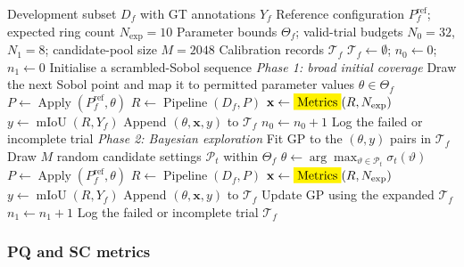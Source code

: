 \documentclass[a4paper,fleqn]{cas-dc}
\let\texthl\hl
\renewcommand{\hl}[1]{\ifmmode\colorbox{yellow}{\ensuremath{#1}}\else\texthl{#1}\fi}
\begin{document}
\begin{algorithm}[ht]
\caption{Generating calibration examples through space-filling
sampling and Bayesian exploration}
\label{alg:bo_exploration}
\begin{algorithmic}[1]
\Require Development subset $D_f$ with GT annotations $Y_f$
\Require Reference configuration $P_f^{\mathrm{ref}}$; expected ring count $N_{\mathrm{exp}}=10$
\Require Parameter bounds $\Theta_f$;
         valid-trial budgets $N_0=32$, $N_1=8$;
         candidate-pool size $M=2048$
\Ensure Calibration records $\mathcal{T}_f$
\State $\mathcal{T}_f\gets\emptyset$;
       $n_0\gets0$; $n_1\gets0$
\State Initialise a scrambled-Sobol sequence
\Statex \textit{Phase 1: broad initial coverage}
    \State Draw the next Sobol point and map it to
           permitted parameter values $\theta\in\Theta_f$
    \State $P\gets\operatorname{Apply}
           (P_f^{\mathrm{ref}},\theta)$
    \State $R\gets\operatorname{Pipeline}(D_f,P)$
        \State $\mathbf{x}\gets\hl{\operatorname{Metrics}}(R,N_{\mathrm{exp}})$
        \State $y\gets\operatorname{mIoU}(R,Y_f)$
        \State Append $(\theta,\mathbf{x},y)$
               to $\mathcal{T}_f$
        \State $n_0\gets n_0+1$
    \Else
        \State Log the failed or incomplete trial
    \EndIf
\EndWhile
\Statex \textit{Phase 2: Bayesian exploration}
\State Fit GP to the $(\theta,y)$ pairs in $\mathcal{T}_f$
    \State Draw $M$ random candidate settings
           $\mathcal{P}_t$ within $\Theta_f$
    \State $\theta\gets
           \arg\max_{\vartheta\in\mathcal{P}_t}
           \sigma_t(\vartheta)$
    \State $P\gets\operatorname{Apply}
           (P_f^{\mathrm{ref}},\theta)$
    \State $R\gets\operatorname{Pipeline}(D_f,P)$
        \State $\mathbf{x}\gets\hl{\operatorname{Metrics}}(R,N_{\mathrm{exp}})$
        \State $y\gets\operatorname{mIoU}(R,Y_f)$
        \State Append $(\theta,\mathbf{x},y)$
               to $\mathcal{T}_f$
        \State Update GP using the expanded $\mathcal{T}_f$
        \State $n_1\gets n_1+1$
    \Else
        \State Log the failed or incomplete trial
    \EndIf
\EndWhile
\State \Return $\mathcal{T}_f$
\end{algorithmic}
\end{algorithm}

\subsubsection{PQ and SC metrics}
\label{sec:pq-sc-metrics}
\end{document}
